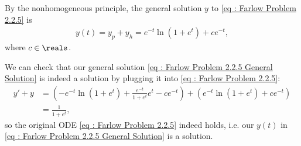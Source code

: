 {By the nonhomogeneous principle, the general solution $y$ to \eqref{eq : Farlow Problem 2.2.5} is
\begin{align}
y(t)
=
y_{p} + y_{h}
=
e^{-t} \ln\left(1 + e^{t}\right) + c e^{-t},%
\label{eq : Farlow Problem 2.2.5 General Solution}
\end{align}
where $c \in \reals$.

We can check that our general solution \eqref{eq : Farlow Problem 2.2.5 General Solution} is indeed a solution by plugging it into \eqref{eq : Farlow Problem 2.2.5}:
\begin{align*}
y' + y
&=
\left(-e^{-t} \ln\left(1 + e^{t}\right) + \frac{e^{-t}}{1 + e^{t}} e^{t} - c e^{-t}\right) + \left(e^{-t} \ln\left(1 + e^{t}\right) + c e^{-t}\right)
\\
&=
\frac{1}{1 + e^{t}},
\end{align*}
so the original ODE \eqref{eq : Farlow Problem 2.2.5} indeed holds, i.e. our $y(t)$ in \eqref{eq : Farlow Problem 2.2.5 General Solution} is a solution.}%